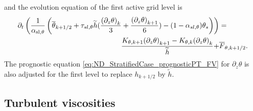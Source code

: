 and the evolution equation of the first active grid level is
\begin{equation}
    \begin{aligned}
	\label{eq:ND_StratifiedCase_semiDiscreteEkmanEqPTFVfree}
	    \partial_t \left(\frac{1}{\alpha_{\rm sl, \theta}}
	    \left(
	    \overline{\theta}_{k+1/2} + \tau_{sl, \theta}
	\widetilde{h}(\frac{{(\partial_z \theta)}_k}{3} +
	\frac{{(\partial_z \theta)}_{k+1}}{6})
	 - (1 - \alpha_{sl, \theta})\theta_s
	    \right) \right)&
	= \\
	    \frac{K_{\theta, k+1}{(\partial_z \theta)}_{k+1} -
	K_{\theta,k} {(\partial_z \theta)}_k}{\widetilde{h}}
	    + &\overline{F}_{\theta, k+1/2}.
    \end{aligned}
\end{equation}
The prognostic equation \eqref{eq:ND_StratifiedCase_prognosticPT_FV}
for $\partial_z \theta$ is also adjusted for the first
level to replace $h_{k+1/2}$ by $\widetilde{h}$.
\subsection{Turbulent viscosities}
\label{sec:ND_StratifiedCase_turbulentVisc}
